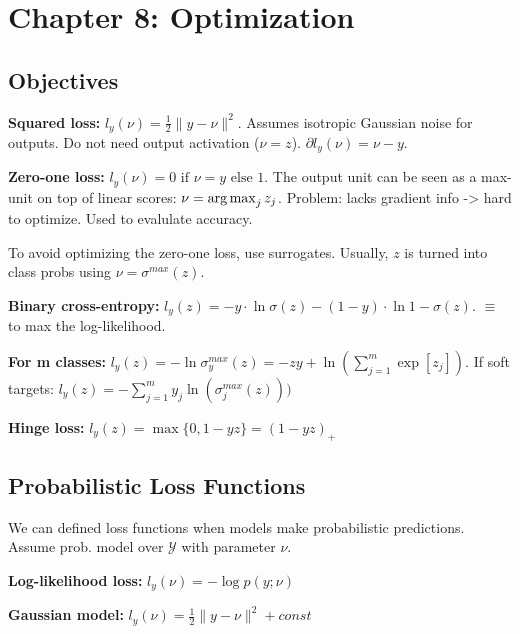 \section*{Chapter 8: Optimization}
\subsection*{Objectives}
\textbf{Squared loss:} $l_{y}(\nu) = \frac{1}{2} \|y-\nu\|^2 $. Assumes isotropic Gaussian noise for outputs. Do not need output activation ($\nu = z$). $\partial l_y(\nu) = \nu - y$. 

\textbf{Zero-one loss:} $l_{y}(\nu) = 0 \text{ if } \nu=y \text{ else } 1$. The output unit can be seen as a max-unit on top of linear scores: $\nu = \operatorname*{arg\,max}_j{z_j}$. Problem: lacks gradient info -> hard to optimize. Used to evalulate accuracy.

To avoid optimizing the zero-one loss, use surrogates. Usually, $z$ is turned into class probs using $\nu = \sigma^{max}(z)$.

\textbf{Binary cross-entropy: } $l_{y}(z)=-y\cdot \ln{\sigma(z)} - (1-y)\cdot \ln{1-\sigma(z)}$. $\equiv$ to max the log-likelihood.

\textbf{For m classes: } $l_{y}(z)=-\ln{\sigma_{y}^{max}(z)} = -z{y} + \ln({\sum_{j=1}^m \exp{[z_j]}})$. If soft targets: $l_{y}(z)=-\sum_{j=1}^m y_j\ln(\sigma_j^{max}(z)))$

\textbf{Hinge loss: } $l_y(z) = \max\{0, 1-yz\} = (1-yz)_+$

\subsection*{Probabilistic Loss Functions}
We can defined loss functions when models make probabilistic predictions. Assume prob. model over $\mathcal{Y}$ with parameter $\nu$.

\textbf{Log-likelihood loss: } $l_y(\nu) = -\log p(y;\nu)$

\textbf{Gaussian model: } $l_y(\nu) = \frac{1}{2}\|y-\nu\|^2 + const$


